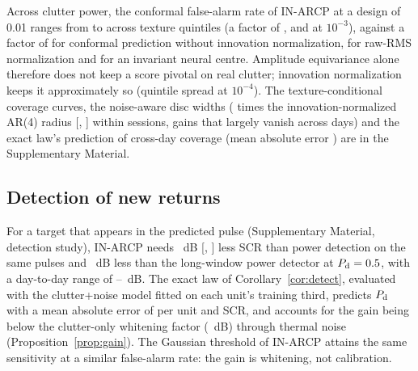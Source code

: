 \documentclass[journal]{IEEEtran}
\begin{document}
Across clutter power, the conformal false-alarm rate of IN-ARCP at a design of 0.01 ranges from \QPfaINMin{} to \QPfaINMax{} across texture quintiles (a factor of \QPfaINSpread, and \LInConfSpreadThree{} at $10^{-3}$), against a factor of \QPfaUSpread{} for conformal prediction without innovation normalization, \QPfaRMSSpread{} for raw-RMS normalization and \QPfaMLPSpread{} for an invariant neural centre. Amplitude equivariance alone therefore does not keep a score pivotal on real clutter; innovation normalization keeps it approximately so (quintile spread \LInConfSpreadFour{} at $10^{-4}$). The texture-conditional coverage curves, the noise-aware disc widths (\SameNAFourA{} times the innovation-normalized AR(4) radius [\SameLoNAFourA, \SameHiNAFourA] within sessions, gains that largely vanish across days) and the exact law's prediction of cross-day coverage (mean absolute error \CFiveMaeA) are in the Supplementary Material.

\subsection{Detection of new returns}\label{sec:detect}
For a target that appears in the predicted pulse (Supplementary Material, detection study), IN-ARCP needs \DetINGainCAHalf~dB [\DetINGainCALoHalf, \DetINGainCAHiHalf] less SCR than power detection on the same pulses and \DetINGainLocHalf~dB less than the long-window power detector at $P_{\rm d}=0.5$, with a day-to-day range of \DayGainMin--\DayGainMax~dB. The exact law of Corollary~\ref{cor:detect}, evaluated with the clutter+noise model fitted on each unit's training third, predicts $P_{\rm d}$ with a mean absolute error of \DetMae{} per unit and SCR, and accounts for the gain being below the clutter-only whitening factor (\DetNaiveGain~dB) through thermal noise (Proposition~\ref{prop:gain}). The Gaussian threshold of IN-ARCP attains the same sensitivity at a similar false-alarm rate: the gain is whitening, not calibration.
\end{document}
